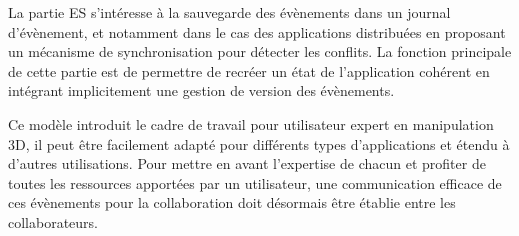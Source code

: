 La partie \gls{ES} s'intéresse à la sauvegarde des évènements dans un journal 
d'évènement, et notamment dans le cas des applications distribuées en proposant 
un mécanisme de synchronisation pour détecter les conflits. La fonction principale 
de cette partie est de permettre de recréer un état de l'application cohérent en 
intégrant implicitement une gestion de version des évènements.

Ce modèle introduit le cadre de travail pour utilisateur expert en manipulation 3D, il 
peut être facilement adapté pour différents types d'applications et étendu à 
d'autres utilisations. 
Pour mettre en avant l'expertise de chacun et profiter de 
toutes les ressources apportées par un utilisateur, une communication efficace de 
ces évènements pour la collaboration doit désormais être établie entre les 
collaborateurs.